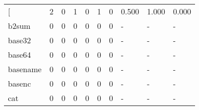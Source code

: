 \begin{longtable}{lp{2.0cm}p{2.0cm}p{2.0cm}p{2.0cm}p{2.0cm}p{2.0cm}p{2.0cm}p{2.0cm}p{2.0cm}}
\bottomrule
\endlastfoot
{[}         &                      2 &                                  0 &                                 1 &                                0 &                                 1 &                               0 &                                0.500 &                                  1.000 &                                0.000 \\
b2sum     &                      0 &                                  0 &                                 0 &                                0 &                                 0 &                               0 &                                    - &                                      - &                                    - \\
base32    &                      0 &                                  0 &                                 0 &                                0 &                                 0 &                               0 &                                    - &                                      - &                                    - \\
base64    &                      0 &                                  0 &                                 0 &                                0 &                                 0 &                               0 &                                    - &                                      - &                                    - \\
basename  &                      0 &                                  0 &                                 0 &                                0 &                                 0 &                               0 &                                    - &                                      - &                                    - \\
basenc    &                      0 &                                  0 &                                 0 &                                0 &                                 0 &                               0 &                                    - &                                      - &                                    - \\
cat       &                      0 &                                  0 &                                 0 &                                0 &                                 0 &                               0 &                                    - &                                      - &                                    - \\

\end{longtable}
